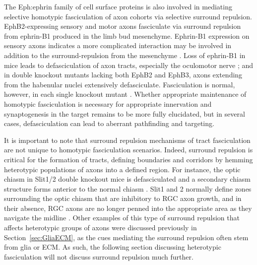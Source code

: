 The Eph:ephrin family of cell surface proteins is also involved in mediating selective homotypic fasciculation of axon cohorts via selective surround repulsion.
EphB2-expressing sensory and motor axons fasciculate via surround repulsion from ephrin-B1 produced in the limb bud mesenchyme.
Ephrin-B1 expression on sensory axons indicates a more complicated interaction may be involved in addition to the surround-repulsion from the mesenchyme \cite{luxey2013eph}.
Loss of ephrin-B1 in mice leads to defasciculation of axon tracts, especially the oculomotor nerve \cite{davy2004ephrin}; and in double knockout mutants lacking both EphB2 and EphB3, axons extending from the habenular nuclei extensively defasciculate.
Fasciculation is normal, however, in each single knockout mutant \cite{orioli1996sek4}.
Whether appropriate maintenance of homotypic fasciculation is necessary for appropriate innervation and synaptogenesis in the target remains to be more fully elucidated, but in several cases, defasciculation can lead to aberrant pathfinding and targeting.

It is important to note that surround repulsion mechanisms of tract fasciculation are not unique to homotypic fasciculation scenarios.
Indeed, surround repulsion is critical for the formation of tracts, defining boundaries and corridors by hemming heterotypic populations of axons into a defined region.
For instance, the optic chiasm in Slit1/2 double knockout mice is defasciculated and a secondary chiasm structure forms anterior to the normal chiasm \cite{plump2002slit1}.
Slit1 and 2 normally define zones surrounding the optic chiasm that are inhibitory to RGC axon growth, and in their absence, RGC axons are no longer penned into the appropriate area as they navigate the midline \cite{plump2002slit1}.
Other examples of this type of surround repulsion that affects heterotypic groups of axons were discussed previously in Section~\ref{sec:GliaECM}, as the cues mediating the surround repulsion often stem from glia or ECM.
As such, the following section discussing heterotypic fasciculation will not discuss surround repulsion much further.
